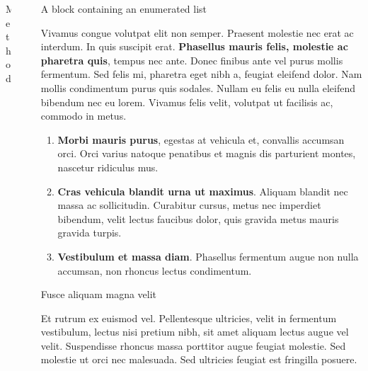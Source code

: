 \documentclass[final]{beamer}
\newlength{\sepwidth}
\newlength{\colwidth}
\newcommand{\separatorcolumn}{\begin{column}{\sepwidth}\end{column}}
\begin{document}
\begin{frame}[t]
\begin{columns}[t]
\begin{column}{\colwidth}
      \begin{block}{Method}


      \end{block}

    \end{column}

    \separatorcolumn

    \begin{column}{\colwidth}

      \begin{block}{A block containing an enumerated list}

        Vivamus congue volutpat elit non semper. Praesent molestie nec erat ac
        interdum. In quis suscipit erat. \textbf{Phasellus mauris felis, molestie
          ac pharetra quis}, tempus nec ante. Donec finibus ante vel purus mollis
        fermentum. Sed felis mi, pharetra eget nibh a, feugiat eleifend dolor. Nam
        mollis condimentum purus quis sodales. Nullam eu felis eu nulla eleifend
        bibendum nec eu lorem. Vivamus felis velit, volutpat ut facilisis ac,
        commodo in metus.

        \begin{enumerate}
          \item \textbf{Morbi mauris purus}, egestas at vehicula et, convallis
                accumsan orci. Orci varius natoque penatibus et magnis dis parturient
                montes, nascetur ridiculus mus.
          \item \textbf{Cras vehicula blandit urna ut maximus}. Aliquam blandit nec
                massa ac sollicitudin. Curabitur cursus, metus nec imperdiet bibendum,
                velit lectus faucibus dolor, quis gravida metus mauris gravida turpis.
          \item \textbf{Vestibulum et massa diam}. Phasellus fermentum augue non
                nulla accumsan, non rhoncus lectus condimentum.
        \end{enumerate}

      \end{block}

      \begin{block}{Fusce aliquam magna velit}

        Et rutrum ex euismod vel. Pellentesque ultricies, velit in fermentum
        vestibulum, lectus nisi pretium nibh, sit amet aliquam lectus augue vel
        velit. Suspendisse rhoncus massa porttitor augue feugiat molestie. Sed
        molestie ut orci nec malesuada. Sed ultricies feugiat est fringilla
        posuere.


\end{block}
\end{column}
\end{columns}
\end{frame}
\end{document}
